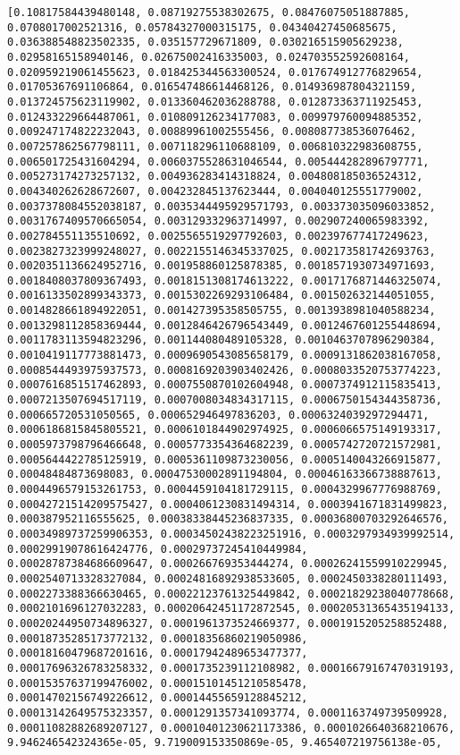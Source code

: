 \documentclass[11pt]{article}
\begin{document}
\begin{Verbatim}[commandchars=\\\{\}]
[0.10817584439480148, 0.08719275538302675, 0.08476075051887885, 0.0708017002521316, 0.05784327000315175, 0.04340427450685675, 0.036388548823502335, 0.035157729671809, 0.030216515905629238, 0.02958165158940146, 0.02675002416335003, 0.024703552592608164, 0.020959219061455623, 0.018425344563300524, 0.017674912776829654, 0.01705367691106864, 0.016547486614468126, 0.014936987804321159, 0.013724575623119902, 0.013360462036288788, 0.012873363711925453, 0.012433229664487061, 0.010809126234177083, 0.009979760094885352, 0.009247174822232043, 0.00889961002555456, 0.008087738536076462, 0.007257862567798111, 0.007118296110688109, 0.006810322983608755, 0.006501725431604294, 0.0060375528631046544, 0.005444282896797771, 0.005273174273257132, 0.004936283414318824, 0.004808185036524312, 0.004340262628672607, 0.004232845137623444, 0.004040125551779002, 0.0037378084552038187, 0.0035344495929571793, 0.003373035096033852, 0.0031767409570665054, 0.003129332963714997, 0.002907240065983392, 0.002784551135510692, 0.0025565519297792603, 0.002397677417249623, 0.0023827323999248027, 0.0022155146345337025, 0.002173581742693763, 0.0020351136624952716, 0.001958860125878385, 0.0018571930734971693, 0.0018408037809367493, 0.0018151308174613222, 0.0017176871446325074, 0.0016133502899343373, 0.0015302269293106484, 0.001502632144051055, 0.0014828661894922051, 0.001427395358505755, 0.0013938981040588234, 0.0013298112858369444, 0.0012846426796543449, 0.0012467601255448694, 0.0011783113594823296, 0.001144080489105328, 0.0010463707896290384, 0.0010419117773881473, 0.0009690543085658179, 0.0009131862038167058, 0.0008544493975937573, 0.0008169203903402426, 0.0008033520753774223, 0.0007616851517462893, 0.0007550870102604948, 0.0007374912115835413, 0.0007213507694517119, 0.0007008034834317115, 0.0006750154344358736, 0.000665720531050565, 0.000652946497836203, 0.0006324039297294471, 0.0006186815845805521, 0.0006101844902974925, 0.0006066575149193317, 0.0005973798796466648, 0.0005773354364682239, 0.0005742720721572981, 0.0005644422785125919, 0.0005361109873230056, 0.0005140043266915877, 0.00048484873698083, 0.00047530002891194804, 0.00046163366738887613, 0.0004496579153261753, 0.0004459104181729115, 0.0004329967776988769, 0.00042721514209575427, 0.0004061230831494314, 0.0003941671831499823, 0.000387952116555625, 0.00038338445236837335, 0.00036800703292646576, 0.00034989737259906353, 0.00034502438223251916, 0.0003297934939992514, 0.00029919078616424776, 0.00029737245410449984, 0.00028787384686609647, 0.000266769353444274, 0.00026241559910229945, 0.0002540713328327084, 0.00024816892938533605, 0.0002450338280111493, 0.0002273388366630465, 0.00022123761325449842, 0.00021829238040778668, 0.0002101696127032283, 0.00020642451172872545, 0.00020531365435194133, 0.00020244950734896327, 0.0001961373524669377, 0.0001915205258852488, 0.00018735285173772132, 0.00018356860219050986, 0.00018160479687201616, 0.00017942489653477377, 0.00017696326783258332, 0.0001735239112108982, 0.00016679167470319193, 0.00015357637199476002, 0.00015101451210585478, 0.00014702156749226612, 0.00014455659128845212, 0.00013142649575323357, 0.0001291357341093774, 0.0001163749739509928, 0.00011082882689207127, 0.00010401230621173386, 0.0001026640368210676, 9.946246542324365e-05, 9.719009153350869e-05, 9.465407219756138e-05, 
\end{Verbatim}
\end{document}
